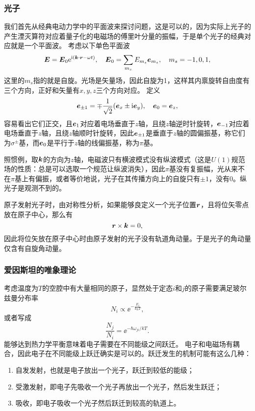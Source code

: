 \subsubsection{光子}

我们首先从经典电动力学中的平面波来探讨问题，这是可以的，因为实际上光子的产生湮灭算符对应着量子化的电磁场的傅里叶分量的振幅，于是单个光子的经典对应就是一个平面波。
考虑以下单色平面波
\begin{equation}
    \vb*{E} = \vb*{E}_0 \mathrm{e}^{\mathrm{i}(\vb*{k} \cdot \vb*{r} - \omega t)}, \quad \vb*{E}_0 = \sum_{m_s} E_{m_s} \vb*{e}_{m_s}, \quad m_s = -1, 0, 1,
\end{equation}
这里的$m_s$指的就是自旋。光场是矢量场，因此自旋为1，这样其内禀旋转自由度有三个方向，正好和矢量有$x, y, z$三个方向对应。
定义
\begin{equation}
    \vb*{e}_{\pm 1} = \mp \frac{1}{\sqrt{2}} (\vb*{e}_x \pm \mathrm{i} \vb*{e}_y), \quad \vb*{e}_0 = \vb*{e}_z,
\end{equation}
容易看出它们正交，且$\vb*{e}_1$对应着电场垂直于$z$轴，且绕$z$轴逆时针旋转，$\vb*{e}_{-1}$对应着电场垂直于$z$轴，且绕$z$轴顺时针旋转，因此$\vb*{e}_{\pm 1}$是垂直于$z$轴的圆偏振基，称它们为$\sigma^\pm$基，而$\vb*{e}_0$是平行于$z$轴的线偏振基，称为$\pi$基。

照惯例，取$\vb*{k}$的方向为$z$轴，电磁波只有横波模式没有纵波模式（这是$U(1)$规范场的性质：总是可以选取一个规范让纵波消失），因此$\pi$基没有复振幅，光从来不在$\pi$基上有偏振，或者等价地说，光子在其传播方向上的自旋只有$\pm 1$，没有$0$。纵光子是观测不到的。

原子发射光子时，由对称性分析，如果能够良定义一个光子位置$\vb*{r}$，且将位矢零点放在原子中心，那么有
\[
    \vb*{r} \times \vb*{k} = 0,
\]
因此将位矢放在原子中心时由原子发射的光子没有轨道角动量。于是光子的角动量仅含有自旋角动量。

\subsubsection{爱因斯坦的唯象理论}\label{sec:einstein-phonomenon}

考虑温度为$T$的空腔中有大量相同的原子，显然处于定态$i$和$j$的原子需要满足玻尔兹曼分布率
\[
    N_i \propto \ee^{-\frac{E_i}{k_\text{B} T}},
\]
或者写成
\[
    \frac{N_j}{N_i} = \ee^{-\hbar \omega_{ji} / kT}.
\]
能够达到热力学平衡意味着电子需要在不同能级之间跃迁。
电子和电磁场有耦合，因此电子在不同能级上跃迁确实是可以的。跃迁发生的机制可能有这么几种：
\begin{enumerate}
    \item 自发发射，也就是电子放出一个光子，跃迁到较低的能级；
    \item 受激发射，即电子先吸收一个光子再放出一个光子，然后发生跃迁；
    \item 吸收，即电子吸收一个光子然后跃迁到较高的轨道上。
\end{enumerate}


